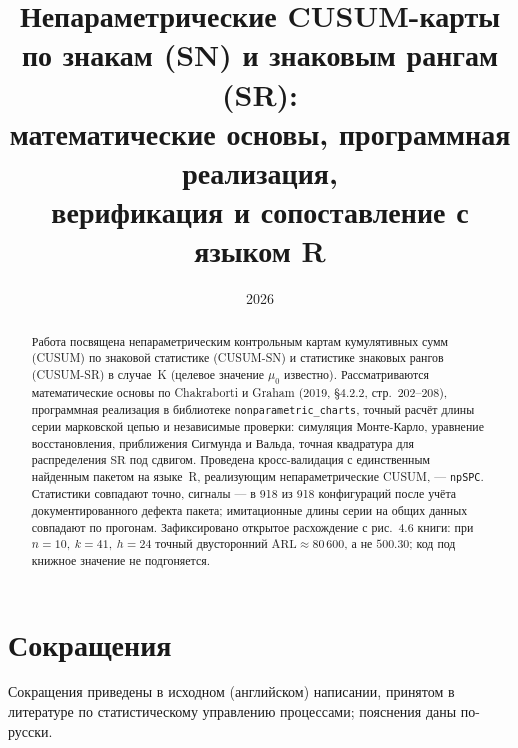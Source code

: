 \documentclass[11pt,a4paper]{article}
\title{\bfseries Непараметрические CUSUM-карты по знакам (SN) и знаковым
рангам (SR):\\ математические основы, программная реализация,\\
верификация и сопоставление с языком R}
\author{}
\date{2026}
\newcommand{\SR}{\mathrm{SR}}
\newcommand{\ARL}{\mathrm{ARL}}
\begin{document}
\maketitle

\begin{abstract}
\noindent
Работа посвящена непараметрическим контрольным картам кумулятивных сумм
(CUSUM) по знаковой статистике (CUSUM-SN) и статистике знаковых рангов
(CUSUM-SR) в случае~K (целевое значение $\mu_0$ известно). Рассматриваются
математические основы по Chakraborti и Graham (2019, \S4.2.2, стр.~202--208),
программная реализация в библиотеке \texttt{nonparametric\_charts},
точный расчёт длины серии марковской цепью и независимые проверки:
симуляция Монте-Карло, уравнение восстановления, приближения Сигмунда и
Вальда, точная квадратура для распределения $\SR$ под сдвигом. Проведена
кросс-валидация с единственным найденным пакетом на языке~R, реализующим
непараметрические CUSUM, --- \texttt{npSPC}. Статистики совпадают точно,
сигналы --- в 918 из 918 конфигураций после учёта документированного дефекта
пакета; имитационные длины серии на общих данных совпадают по прогонам.
Зафиксировано открытое расхождение с рис.~4.6 книги: при
$n=10,\ k=41,\ h=24$ точный двусторонний $\ARL \approx 80\,600$, а не
$500.30$; код под книжное значение не подгоняется.
\end{abstract}

\tableofcontents

\section*{Сокращения}
Сокращения приведены в исходном (английском) написании, принятом в
литературе по статистическому управлению процессами; пояснения даны
по-русски.
\end{document}
